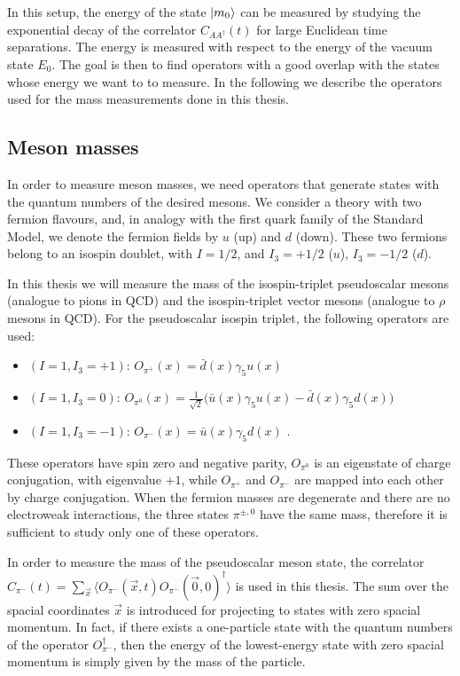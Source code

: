 In this setup, the energy of the state $\ket{m_0}$ can be measured by studying the exponential decay of the correlator $C_{AA^{\dagger}}(t)$ for large Euclidean time separations. The energy is measured with respect to the energy of the vacuum state $E_0$. The goal is then to find operators with a good overlap with the states whose energy we want to to measure. In the following we describe the operators used for the mass measurements done in this thesis.
 

\subsection{Meson masses}
\label{meson_masses}

In order to measure meson masses, we need operators that generate states with the quantum numbers of the desired mesons. We consider a theory with two fermion flavours, and, in analogy with the first quark family of the Standard Model, we denote the fermion fields by $u$ (up) and $d$ (down). These two fermions belong to an isospin doublet, with $I = 1/2$, and $I_3 = +1/2$ ($u$), $I_3 = -1/2$ ($d$).

In this thesis we will measure the mass of the isospin-triplet pseudoscalar mesons (analogue to pions in QCD) and the isospin-triplet vector mesons (analogue to $\rho$ mesons in QCD). For the pseudoscalar isospin triplet, the following operators are used:

\begin{itemize}
\item $(I=1, I_3 = +1)$: $O_{\pi^+}(x) = \bar{d}(x) \gamma_5 u(x)$
\item $(I=1, I_3 = 0)$: $O_{\pi^0}(x) = \frac{1}{\sqrt 2} \bigl( \bar{u}(x) \gamma_5 u(x) - \bar{d}(x) \gamma_5 d(x) \bigr)$
\item $(I=1, I_3 = -1)$: $O_{\pi^-}(x) = \bar{u}(x) \gamma_5 d(x)$ \: .
\end{itemize}
%
These operators have spin zero and negative parity, $O_{\pi^0}$ is an eigenstate of charge conjugation, with eigenvalue $+1$, while $O_{\pi^+}$ and $O_{\pi^-}$ are mapped into each other by charge conjugation. When the fermion masses are degenerate and there are no electroweak interactions, the three states $\pi^{\pm,0}$ have the same mass, therefore it is sufficient to study only one of these operators.

In order to measure the mass of the pseudoscalar meson state, the correlator $C_{\pi^-}(t) = \sum_{\vec x} \langle O_{\pi^-}(\vec x,t)  O_{\pi^-} (\vec 0,0)^{\dagger} \rangle$ is used in this thesis. The sum over the spacial coordinates $\vec x$ is introduced for projecting to states with zero spacial momentum. In fact, if there exists a one-particle state with the quantum numbers of the operator $O^{\dagger}_{\pi^-}$, then the energy of the lowest-energy state with zero spacial momentum is simply given by the mass of the particle.

